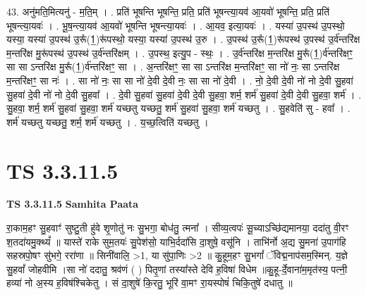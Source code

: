\documentclass[17pt]{extarticle}
\begin{document}
43. अनु॑मति॒मित्यनु॑ - म॒ति॒म् । . प्रति॑ भूषन्ति भूषन्ति॒ प्रति॒ प्रति॑ भूषन्त्या॒यव॑ आ॒यवो॑ भूषन्ति॒ प्रति॒ प्रति॑ भूषन्त्या॒यवः॑ । . भू॒ष॒न्त्या॒यव॑ आ॒यवो॑ भूषन्ति भूषन्त्या॒यवः॑ । . आ॒यव॒ इत्या॒यवः॑ । . यस्या॑ उ॒पस्थ॑ उ॒पस्थो॒ यस्या॒ यस्या॑ उ॒पस्थ॑ उ॒रू᳚(1॒)रू॑पस्थो॒ यस्या॒ यस्या॑ उ॒पस्थ॑ उ॒रु । . उ॒पस्थ॑ उ॒रू᳚(1॒)रू॑पस्थ॑ उ॒पस्थ॑ उ॒र्व॑न्तरि॑क्ष म॒न्तरि॑क्ष मु॒रू॑पस्थ॑ उ॒पस्थ॑ उ॒र्व॑न्तरि॑क्षम् । . उ॒पस्थ॒ इत्यु॒प - स्थः॒ । . उ॒र्व॑न्तरि॑क्ष म॒न्तरि॑क्ष मु॒रू᳚(1॒)र्व॑न्तरि॑क्षꣳ॒॒ सा सा ऽन्तरि॑क्ष मु॒रू᳚(1॒)र्व॑न्तरि॑क्षꣳ॒॒ सा । . अ॒न्तरि॑क्षꣳ॒॒ सा सा ऽन्तरि॑क्ष म॒न्तरि॑क्षꣳ॒॒ सा नो॑ नः॒ सा ऽन्तरि॑क्ष म॒न्तरि॑क्षꣳ॒॒ सा नः॑ । . सा नो॑ नः॒ सा सा नो॑ दे॒वी दे॒वी नः॒ सा सा नो॑ दे॒वी । . नो॒ दे॒वी दे॒वी नो॑ नो दे॒वी सु॒हवा॑ सु॒हवा॑ दे॒वी नो॑ नो दे॒वी सु॒हवा᳚ । . दे॒वी सु॒हवा॑ सु॒हवा॑ दे॒वी दे॒वी सु॒हवा॒ शर्म॒ शर्म॑ सु॒हवा॑ दे॒वी दे॒वी सु॒हवा॒ शर्म॑ । . सु॒हवा॒ शर्म॒ शर्म॑ सु॒हवा॑ सु॒हवा॒ शर्म॑ यच्छतु यच्छतु॒ शर्म॑ सु॒हवा॑ सु॒हवा॒ शर्म॑ यच्छतु । . सु॒हवेति॑ सु - हवा᳚ । . शर्म॑ यच्छतु यच्छतु॒ शर्म॒ शर्म॑ यच्छतु । . य॒च्छ॒त्विति॑ यच्छतु । \newline
\pagebreak
{}

\section{ TS 3.3.11.5 }

\textbf{TS 3.3.11.5 } \newline
\textbf{Samhita Paata} \newline

रा॒काम॒हꣳ सु॒हवाꣳ॑ सुष्टु॒ती हु॑वे शृ॒णोतु॑ नः सु॒भगा॒ बोध॑तु॒ त्मना᳚ । सीव्य॒त्वपः॑ सू॒च्याऽच्छि॑द्यमानया॒ ददा॑तु वी॒रꣳ श॒तदा॑यमु॒क्थ्यं᳚ ॥ यास्ते॑ राके सुम॒तयः॑ सु॒पेश॑सो॒ याभि॒र्ददा॑सि दा॒शुषे॒ वसू॑नि । ताभि॑र्नो अ॒द्य सु॒मना॑ उ॒पाग॑हि सहस्रपो॒षꣳ सु॑भगे॒ ररा॑णा ॥ सिनी॑वालि॒ >1, या सु॑पा॒णिः >2 ॥ कु॒हूम॒हꣳ सु॒भगां᳚ ॅविद्म॒नाप॑सम॒स्मिन्. य॒ज्ञे सु॒हवां᳚ जोहवीमि ।सा नो॑ ददातु॒ श्रव॑णं ( ) पितृ॒णां तस्या᳚स्ते देवि ह॒विषा॑ विधेम ॥कु॒हू-र्दे॒वाना॑म॒मृत॑स्य॒ पत्नी॒ हव्या॑ नो अ॒स्य ह॒विष॑श्चिकेतु । सं दा॒शुषे॑ कि॒रतु॒ भूरि॑ वा॒मꣳ रा॒यस्पोषं॑ चिकि॒तुषे॑ दधातु ॥ \newline
\end{document}
